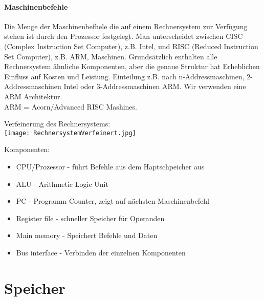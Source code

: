 		\paragraph{Maschinenbefehle} Die Menge der Maschinenbefhele die auf einem Rechnersystem zur Verfügung stehen
		ist durch den Prozessor festgelegt. Man unterscheidet zwischen CISC (Complex Instruction Set Computer),
		z.B. Intel, und RISC (Reduced Instruction Set Computer), z.B. ARM, Maschinen. Grundsätzlich 
		enthalten alle Rechnersystem ähnliche Komponenten, aber die genaue Struktur hat Erheblichen
		Einfluss auf Kosten und Leistung. Einteilung z.B. nach n-Addressmaschinen, 2-Addressmaschinen Intel
		oder 3-Addressmaschinen ARM. Wir verwenden eine ARM Architektur. \\
		ARM = Acorn/Advanced RISC Mashines.

		\begin{center}
			Verfeinerung des Rechnersystems: \\
			\texttt{[image: RechnersystemVerfeinert.jpg]}
		\end{center}

		Komponenten:
		\begin{itemize}
			\item CPU/Prozessor - führt Befehle aus dem Haptschpeicher aus
			\item ALU - Arithmetic Logic Unit
			\item PC - Programm Counter, zeigt auf nächsten Maschinenbefehl
			\item Register file - schneller Speicher für Operanden
			\item Main memory - Speichert Befehle und Daten
			\item Bus interface - Verbinden der einzelnen Komponenten
		\end{itemize}


\newpage
\section{Speicher}
